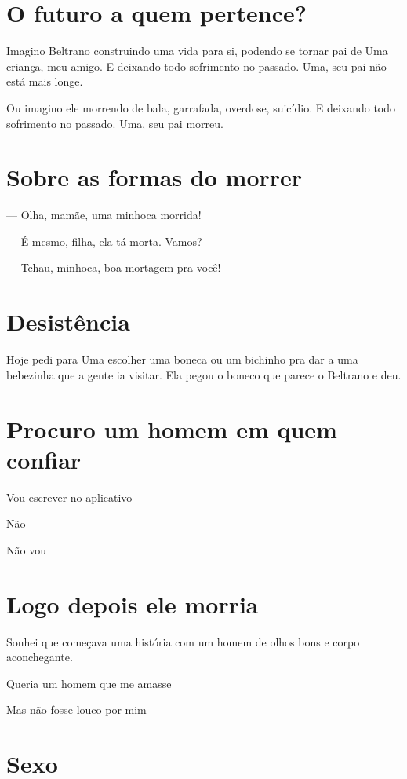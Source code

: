 \chapter{O futuro a quem pertence?}

Imagino Beltrano construindo uma vida para si, podendo se tornar pai de
Uma criança, meu amigo. E deixando todo sofrimento no passado. Uma, seu
pai não está mais longe.

Ou imagino ele morrendo de bala, garrafada, overdose, suicídio. E
deixando todo sofrimento no passado. Uma, seu pai morreu.

\chapter{Sobre as formas do morrer}

{\parindent0pt
— Olha, mamãe, uma minhoca morrida!

— É mesmo, filha, ela tá morta. Vamos?

— Tchau, minhoca, boa mortagem pra você!
}
\chapter{Desistência}

Hoje pedi para Uma escolher uma boneca ou um bichinho pra dar a uma
bebezinha que a gente ia visitar. Ela pegou o boneco que parece o
Beltrano e deu.

\chapter{Procuro um homem em quem confiar}

{\parindent0pt
Vou escrever no aplicativo

Não

Não vou
}

\chapter{Logo depois ele morria}

Sonhei que começava uma história com um homem de olhos bons e corpo
aconchegante.

Queria um homem que me amasse

Mas não fosse louco por mim

\chapter{Sexo}

